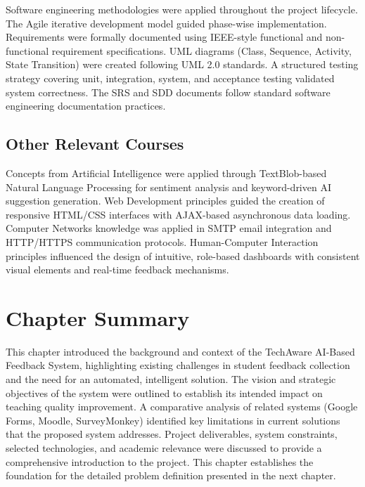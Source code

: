 Software engineering methodologies were applied throughout the project lifecycle. The Agile iterative development model guided phase-wise implementation. Requirements were formally documented using IEEE-style functional and non-functional requirement specifications. UML diagrams (Class, Sequence, Activity, State Transition) were created following UML 2.0 standards. A structured testing strategy covering unit, integration, system, and acceptance testing validated system correctness. The SRS and SDD documents follow standard software engineering documentation practices.

\subsection{Other Relevant Courses}

Concepts from Artificial Intelligence were applied through TextBlob-based Natural Language Processing for sentiment analysis and keyword-driven AI suggestion generation. Web Development principles guided the creation of responsive HTML/CSS interfaces with AJAX-based asynchronous data loading. Computer Networks knowledge was applied in SMTP email integration and HTTP/HTTPS communication protocols. Human-Computer Interaction principles influenced the design of intuitive, role-based dashboards with consistent visual elements and real-time feedback mechanisms.


\section{Chapter Summary}

This chapter introduced the background and context of the TechAware AI-Based Feedback System, highlighting existing challenges in student feedback collection and the need for an automated, intelligent solution. The vision and strategic objectives of the system were outlined to establish its intended impact on teaching quality improvement. A comparative analysis of related systems (Google Forms, Moodle, SurveyMonkey) identified key limitations in current solutions that the proposed system addresses. Project deliverables, system constraints, selected technologies, and academic relevance were discussed to provide a comprehensive introduction to the project. This chapter establishes the foundation for the detailed problem definition presented in the next chapter.

